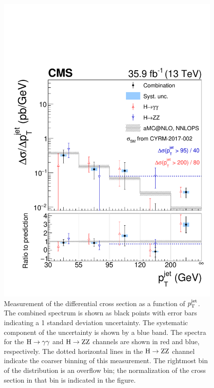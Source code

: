 \begin{figure}[hbtp]
  \begin{center}
    \includegraphics[width=0.49\linewidth]{img/differentials/spectra_ptjet.pdf}
    \caption{
        Measurement of the differential cross section as a function of $p_\mathrm{T}^\text{jet} $. The combined spectrum is shown as black points with error bars indicating a 1 standard deviation uncertainty. The systematic component of the uncertainty is shown by a blue band. The spectra for the $\mathrm{H}\to\mathrm{\gamma}\mathrm{\gamma}$ and $\mathrm{H}\to\mathrm{Z}\mathrm{Z}$ channels are shown in red and blue, respectively.
        The dotted horizontal lines in the $\mathrm{H}\to\mathrm{Z}\mathrm{Z}$ channel indicate the coarser binning of this measurement.
        The rightmost bin of the distribution is an overflow bin; the normalization of the cross section in that bin is indicated in the figure.
        }
    \label{fig:CombinedSpectra_ptjet}
  \end{center}
\end{figure}
